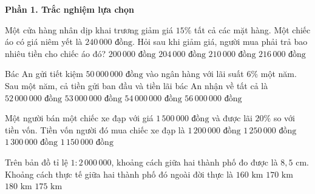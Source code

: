\textbf{Phần 1. Trắc nghiệm lựa chọn}

\begin{ex} %
Một cửa hàng nhân dịp khai trương giảm giá $15\%$ tất cả các mặt hàng. Một chiếc áo có giá niêm yết là $240\,000\text{ đồng}$. Hỏi sau khi giảm giá, người mua phải trả bao nhiêu tiền cho chiếc áo đó?
\choice
{$200\,000\text{ đồng}$}
{\True $204\,000\text{ đồng}$}
{$210\,000\text{ đồng}$}
{$216\,000\text{ đồng}$}
\end{ex}

\begin{ex} %
Bác An gửi tiết kiệm $50\,000\,000\text{ đồng}$ vào ngân hàng với lãi suất $6\%$ một năm. Sau một năm, cả tiền gửi ban đầu và tiền lãi bác An nhận về tất cả là
\choice
{$52\,000\,000\text{ đồng}$}
{\True $53\,000\,000\text{ đồng}$}
{$54\,000\,000\text{ đồng}$}
{$56\,000\,000\text{ đồng}$}
\end{ex}

\begin{ex} %
Một người bán một chiếc xe đạp với giá $1\,500\,000\text{ đồng}$ và được lãi $20\%$ so với tiền vốn. Tiền vốn người đó mua chiếc xe đạp là
\choice
{$1\,200\,000\text{ đồng}$}
{\True $1\,250\,000\text{ đồng}$}
{$1\,300\,000\text{ đồng}$}
{$1\,150\,000\text{ đồng}$}
\end{ex}

\begin{ex} %
Trên bản đồ tỉ lệ $1 : 2\,000\,000$, khoảng cách giữa hai thành phố đo được là $8{,}5\text{ cm}$. Khoảng cách thực tế giữa hai thành phố đó ngoài đời thực là
\choice
{$160\text{ km}$}
{\True $170\text{ km}$}
{$180\text{ km}$}
{$175\text{ km}$}
\end{ex}

